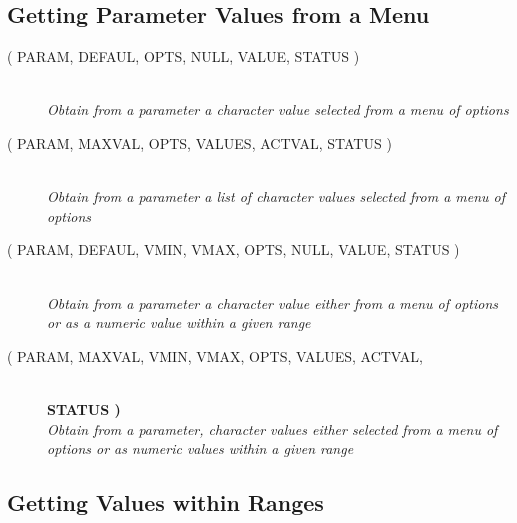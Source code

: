 \documentclass[twoside,11pt,nolof]{starlink}
\providecommand{\listline}{\hspace{1pt}\\}
\providecommand{\listova}[1]{}
\providecommand{\listovb}[1]{\textbf{#1}\\}
\begin{document}
\subsection{Getting Parameter Values from a Menu}

\begin{description}
\item [
( PARAM, DEFAUL, OPTS, NULL, VALUE, STATUS )] \listline
\textit{Obtain from a parameter a character value selected from a menu
            of options}
\item [
( PARAM, MAXVAL, OPTS, VALUES, ACTVAL, STATUS )] \listline
\textit{Obtain from a parameter a list of character values selected from
            a menu of options}
\item [
( PARAM, DEFAUL, VMIN, VMAX, OPTS, NULL, VALUE, STATUS )] \listline
\textit{Obtain from a parameter a character value either from a menu of
             options or as a numeric value within a given range}
\item [
( PARAM, MAXVAL, VMIN, VMAX, OPTS, VALUES, ACTVAL, \listova{STATUS )}] \listline
\listovb{STATUS )}
\textit{Obtain from a parameter, character values either selected from a
             menu of options or as numeric values within a given range}
\end{description}

\subsection{Getting Values within Ranges}
\end{document}
